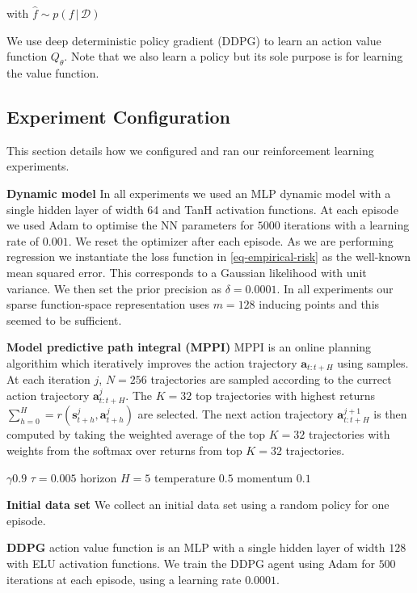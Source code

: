 \documentclass{article}
\newcommand{\state}{\ensuremath{\mathbf{s}}}
\newcommand{\action}{\ensuremath{\mathbf{a}}}
\newcommand{\dataset}{\ensuremath{\mathcal{D}}}
\newcommand{\transitionFn}{\ensuremath{f}}
\renewcommand{\mid}{\,|\,}
\begin{document}
with $\hat{\transitionFn} \sim p(\transitionFn \mid \dataset)$

We use deep deterministic policy gradient (DDPG) \cite{lillicrapContinuousControlDeep2016} to learn an action value function $Q_{\theta}$.
Note that we also learn a policy but its sole purpose is for learning the value function.

\subsection{Experiment Configuration}
This section details how we configured and ran our reinforcement learning experiments.

\textbf{Dynamic model}
In all experiments we used an MLP dynamic model with a single hidden layer of width 64 and TanH activation functions.
At each episode we used Adam \cite{adam} to optimise the NN parameters for $5000$ iterations with a learning rate of $0.001$.
We reset the optimizer after each episode.
As we are performing regression we instantiate the loss function in \cref{eq-empirical-risk} as the well-known mean squared error.
This corresponds to a Gaussian likelihood with unit variance.
We then set the prior precision as $\delta=0.0001$.
In all experiments our sparse function-space representation uses $m=128$ inducing points and this seemed to be sufficient.



\textbf{Model predictive path integral (MPPI)}
MPPI is an online planning algorithim which iteratively improves the action trajectory $\action_{t:t+H}$ using samples.
At each iteration $j$, $N=256$ trajectories are sampled according to the currect action trajectory $\action^{j}_{t:t+H}$.
The $K=32$ top trajectories with highest returns $\sum_{h=0}^{H} = r(\state^{j}_{t+h}, \action^{j}_{t+h})$ are selected.
The next action trajectory $\action^{j+1}_{t:t+H}$ is then computed by taking the weighted average of the top $K=32$ trajectories
with weights from the softmax over returns from top $K=32$ trajectories.

$\gamma 0.9$
$\tau=0.005$
horizon $H=5$
temperature $0.5$
momentum $0.1$

\textbf{Initial data set}
We collect an initial data set using a random policy for one episode.

\textbf{DDPG}
action value function is an MLP with a single hidden layer of width $128$ with ELU activation functions.
We train the DDPG agent using Adam for $500$ iterations at each episode, using a learning rate $0.0001$.
\end{document}
